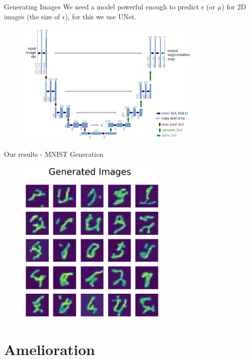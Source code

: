 \documentclass{beamer}
\begin{document}
\begin{frame}{Generating Images}
    We need a \alert{model powerful enough to predict $\epsilon$} (or $\mu$) for \alert{2D images} (the size of $\epsilon$), for this we use \alert{UNet}.

    \begin{figure}
        \centering
        \includegraphics[width = 0.8\textwidth]{imgs/unet-architecture.png}
    \end{figure}
\end{frame}
\begin{frame}{Our results - MNIST Generation}
    \begin{figure}
        \centering
        \includegraphics[width = 0.65\textwidth]{imgs/mnist_res.jpg}
    \end{figure}
\end{frame}
\section{Amelioration}
\end{document}
